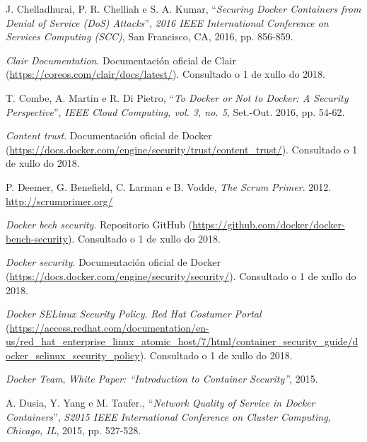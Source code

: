 

\begin{thebibliography}{99}

 J. Chelladhurai, P. R. Chelliah e S. A. Kumar, ``\textit{Securing Docker Containers from Denial of Service (DoS) Attacks}'', {\it 2016 IEEE International Conference on Services Computing (SCC)}, San Francisco, CA, 2016, pp. 856-859.

 \textit{Clair Documentation}. Documentación oficial de Clair (\url{https://coreos.com/clair/docs/latest/}). Consultado o 1 de xullo do 2018.

 T. Combe, A. Martin e R. Di Pietro, ``\textit{To Docker or Not to Docker: A Security Perspective}'', {\it IEEE Cloud Computing, vol. 3, no. 5}, Set.-Out. 2016, pp. 54-62.

 \textit{Content trust}. Documentación oficial de Docker (\url{https://docs.docker.com/engine/security/trust/content\_trust/}). Consultado o 1 de xullo do 2018.

 P. Deemer, G. Benefield, C. Larman e B. Vodde, {\it The Scrum Primer}. 2012. \url{http://scrumprimer.org/}

 \textit{Docker bech security}. Repositorio GitHub (\url{https://github.com/docker/docker-bench-security}). Consultado o 1 de xullo do 2018.

 \textit{Docker security}. Documentación oficial de Docker (\url{https://docs.docker.com/engine/security/security/}). Consultado o 1 de xullo do 2018.

 \textit{Docker SELinux Security Policy}. \textit{Red Hat Costumer Portal} (\url{https://access.redhat.com/documentation/en-us/red_hat_enterprise_linux_atomic_host/7/html/container_security_guide/docker_selinux_security_policy}). Consultado o 1 de xullo do 2018.

 \textit{Docker Team}, \textit{White Paper: ``Introduction to Container Security''}, 2015.

 A. Dusia, Y. Yang e M. Taufer., ``\textit{Network Quality of Service in Docker Containers}'', {\it S2015 IEEE International Conference on Cluster Computing, Chicago, IL}, 2015, pp. 527-528.


\end{thebibliography}

